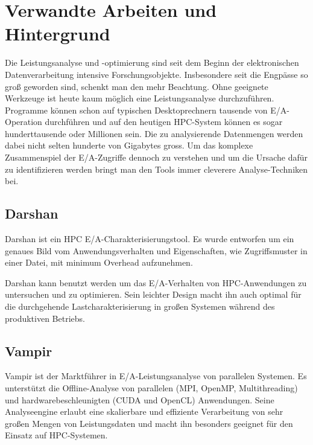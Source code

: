 \section{Verwandte Arbeiten und Hintergrund}
Die Leistungsanalyse und -optimierung sind seit dem Beginn der elektronischen Datenverarbeitung intensive Forschungsobjekte. 
Insbesondere seit die Engpässe so groß geworden sind, schenkt man den mehr Beachtung. 
Ohne geeignete Werkzeuge ist heute kaum möglich eine Leistungsanalyse durchzuführen. 
Programme können schon auf typischen Desktoprechnern tausende von E/A-Operation durchführen und auf den heutigen HPC-System können es sogar hunderttausende oder Millionen sein. 
Die zu analysierende Datenmengen werden dabei nicht selten hunderte von Gigabytes gross. 
Um das komplexe Zusammenspiel der E/A-Zugriffe dennoch zu verstehen und um die Ursache dafür zu identifizieren werden bringt man den Tools immer cleverere Analyse-Techniken bei.

\subsection{Darshan}
Darshan ist ein HPC E/A-Charakterisierungstool.
Es wurde entworfen um ein genaues Bild vom Anwendungsverhalten und Eigenschaften, wie Zugriffsmuster in einer Datei, mit minimum Overhead aufzunehmen.

Darshan kann benutzt werden um das E/A-Verhalten von HPC-Anwendungen zu untersuchen und zu optimieren. 
Sein leichter Design macht ihn auch optimal für die durchgehende Lastcharakterisierung in großen Systemen während des produktiven Betriebs.

\subsection{Vampir}
Vampir  ist der Marktführer in E/A-Leistungsanalyse von parallelen Systemen. 
Es unterstützt die Offline-Analyse von parallelen (MPI, OpenMP, Multithreading) und hardwarebeschleunigten (CUDA und OpenCL) Anwendungen. 
Seine Analyseengine erlaubt eine skalierbare und effiziente Verarbeitung von sehr großen Mengen von Leistungsdaten und macht ihn besonders geeignet für den Einsatz auf HPC-Systemen.

